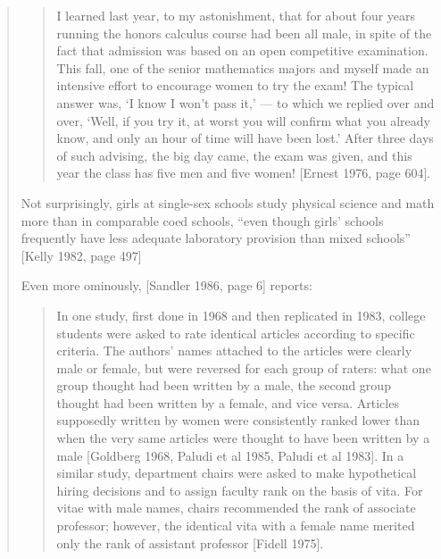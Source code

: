\begin{quote}
\begin{quote}     I learned last year, to my astonishment, that for
     about four years running the honors calculus course
    had been all male, in spite of the fact that admission was based on an open competitive examination.
    This fall, one of the senior mathematics majors and
    myself made an intensive effort to encourage women
    to try the exam! The typical answer was, `I know
    I won't pass it,' --- to which we replied over and
    over, `Well, if you try it, at worst you will confirm
    what you already know, and only an hour of time
    will have been lost.'  After three days of such advising, the big day came, the exam was given, and
    this year the class has five men and five women!
    [Ernest 1976, page 604].
\end{quote}

   Not surprisingly, girls at single-sex schools study physical
science and math more than in comparable coed schools, ``even
though girls' schools frequently have less adequate laboratory
provision than mixed schools'' [Kelly 1982, page 497]

   Even more ominously, [Sandler 1986, page 6] reports:

\begin{quote}

    In one study, first done in 1968 and then replicated
    in 1983, college students were asked to rate identical articles according to specific criteria.  The authors' names attached to the articles were clearly
    male or female, but were reversed for each group
    of raters: what one group thought had been written by a male, the second group thought had been
    written by a female, and vice versa. Articles supposedly written by women were consistently ranked
    lower than when the very same articles were thought
    to have been written by a male [Goldberg 1968,
    Paludi et al 1985, Paludi et al 1983].  In a similar
    study, department chairs were asked to make hypothetical hiring decisions and to assign faculty rank
    on the basis of vita.  For vitae with male names,
    chairs recommended the rank of associate professor;
    however, the identical vita with a female name merited only the rank of assistant professor [Fidell 1975].
\end{quote}


\end{quote}
